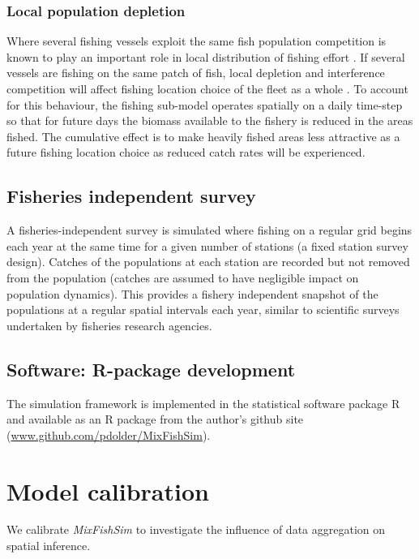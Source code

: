 \documentclass[review]{elsarticle}
\begin{document}
\subsubsection{Local population depletion}

Where several fishing vessels exploit the same fish population competition is
known to play an important role in local distribution of fishing effort
\citep{Gillis1998}. If several vessels are fishing on the same patch of fish,
local depletion and interference competition will affect fishing location
choice of the fleet as a whole \citep{Rijnsdorp2000, Poos2007a}.  To account
for this behaviour, the fishing sub-model operates spatially on a daily
time-step so that for future days the biomass available to the fishery is
reduced in the areas fished. The cumulative effect is to make heavily fished
areas less attractive as a future fishing location choice as reduced catch
rates will be experienced. 

\subsection{Fisheries independent survey}

A fisheries-independent survey is simulated where fishing on a regular grid
begins each year at the same time for a given number of stations (a fixed
station survey design). Catches of the populations at each station are recorded
but not removed from the population (catches are assumed to have negligible
impact on population dynamics). This provides a fishery independent snapshot of
the populations at a regular spatial intervals each year, similar to scientific
surveys undertaken by fisheries research agencies. \\

\subsection{Software: R-package development}

The simulation framework is implemented in the statistical software package R
\citep{RCoreTeam2017} and available as an R package from the author's github
site (\url{www.github.com/pdolder/MixFishSim}).\\

\section{Model calibration}
We calibrate \textit{MixFishSim} to investigate the influence of data
aggregation on spatial inference.
\end{document}
